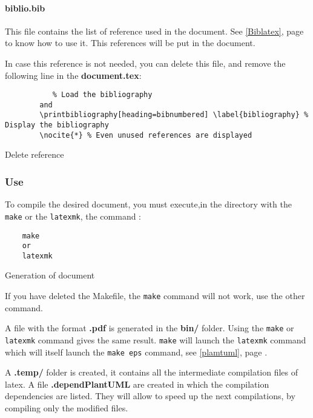 \paragraph{biblio.bib}
This file contains the list of reference used in the document. See \ref{Biblatex}, page
\pageref{Biblatex} to know how to use it.
This references will be put in the document.\newline

In case this reference is not needed, you can delete this file, and remove the following line in the
\textbf{document.tex}:
\begin{code}
    \begin{verbatim}
           % Load the bibliography
        and
        \printbibliography[heading=bibnumbered] \label{bibliography} % Display the bibliography
        \nocite{*} % Even unused references are displayed
    \end{verbatim}
    \caption{Delete reference}
\end{code}

\subsubsection{Use} \label{use}
To compile the desired document, you must execute,in the directory with the \texttt{make}
or the \texttt{latexmk}, the command :
\begin{code}
    \begin{verbatim}
    make
    or
    latexmk
\end{verbatim}
    \caption{Generation of document}
\end{code}

If you have deleted the Makefile, the \texttt{make} command will not work, use the other
command.\newline

A file with the format \textbf{.pdf} is generated in the \textbf{bin/} folder. Using the
\texttt{make} or \texttt{latexmk} command gives the same result.
\texttt{make} will launch the \texttt{latexmk} command which will itself launch
the \texttt{make eps} command, see \ref{plamtuml}, page \pageref{plamtuml}.\newline

A \textbf{.temp/} folder is created, it contains all the intermediate compilation files of
\gls{latex}.
A file \textbf{.dependPlantUML} are created in which the compilation dependencies are listed.
They will allow to speed up the next compilations, by compiling only the modified files.

